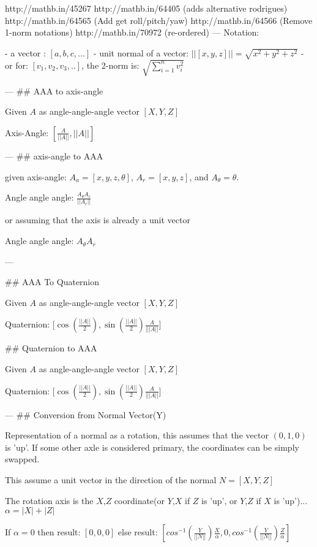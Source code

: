 http://mathb.in/45267
http://mathb.in/64405 (adds alternative rodrigues)
http://mathb.in/64565 (Add get roll/pitch/yaw)
http://mathb.in/64566 (Remove 1-norm notations)
http://mathb.in/70972 (re-ordered)
---
Notation:
 
 - a vector : $[a,b,c,...]$
 - unit normal of a vector: $ ||[x,y,z]|| = \sqrt { x^2+y^2+z^2 } $
   - or for: $ [v_1,v_2,v_3,..] $, the 2-norm is: $ \sqrt { \sum_{i=1}^n v_i^2 } $

---
## AAA to axis-angle

Given $A$ as angle-angle-angle vector $[{X},{Y} ,{Z}] $ 

Axis-Angle: $ [ \frac {A} {||A||}, ||{A}|| ] $

---
## axis-angle to AAA

given axis-angle:
$ A_a =[ {x},{y},{z},{{\theta}}]  $, $A_r=[x,y,z]$, and $A_\theta = \theta$.

Angle angle angle: $   \frac  {{A_\theta}A_r} {||A_r||} $

or assuming that the axis is already a unit vector

Angle angle angle: $   {{A_\theta}A_r}$

---


## AAA To Quaternion

Given $A$ as angle-angle-angle vector $[{X},{Y} ,{Z}]$

Quaternion: [$\cos(\frac {||A||} {2} ),  \sin ( \frac {||A||} {2} ) \frac A {|||A||} $]


## Quaternion to AAA

Given $A$ as angle-angle-angle vector $[{X},{Y} ,{Z}]$

Quaternion: [$\cos(\frac {||A||} {2} ),  \sin ( \frac {||A||} {2} ) \frac A {|||A||} $]


---
## Conversion from Normal Vector(Y)

Representation of a normal as a rotation, this assumes that the vector $(0,1,0)$ is 'up'.  If some other axle is considered primary, the coordinates can be simply swapped.

This assume a unit vector in the direction of the normal
$N = [ X, Y, Z ]$


The rotation axis is the $X$,$Z$ coordinate(or $Y$,$X$ if $Z$ is 'up', or $Y$,$Z$ if $X$ is 'up')...
$   \alpha = |X| + |Z|$

If $\alpha = 0$ then result: $[0,0,0]$
else result: $ [      cos^{-1}( \frac {Y} {||N||} ) \frac X \alpha, 	0, cos^{-1}( \frac Y {||N||}) \frac Z \alpha ] $

